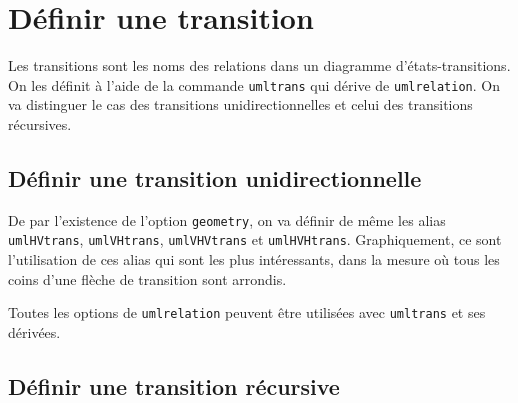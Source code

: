 \documentclass[a4paper,11pt]{report}
\newcommand{\inputTikZ}[1]{%
  }%
\newcommand{\inputTikZ}[1]{%
    \texttt{[image: fig/\#1.pdf]}%
  }%
\begin{document}
\medskip

\begin{minipage}{0.51\textwidth}

\end{minipage}
\begin{minipage}{0.49\textwidth}
\begin{center}
\inputTikZ{statename}
\end{center}
\end{minipage}

\medskip

\section{Définir une transition}\label{s.trans}

Les transitions sont les noms des relations dans un diagramme d'états-transitions. On les définit à l'aide de la commande {\tt umltrans} qui dérive de {\tt umlrelation}. On va distinguer le cas des transitions unidirectionnelles et celui des transitions récursives.

\subsection{Définir une transition unidirectionnelle}\label{s.unitrans}

De par l'existence de l'option {\tt geometry}, on va définir de même les alias {\tt umlHVtrans}, {\tt umlVHtrans}, {\tt umlVHVtrans} et {\tt umlHVHtrans}. Graphiquement, ce sont l'utilisation de ces alias qui sont les plus intéressants, dans la mesure où tous les coins d'une flèche de transition sont arrondis.

\medskip

\begin{minipage}{0.51\textwidth}

\end{minipage}
\begin{minipage}{0.49\textwidth}
\begin{center}
\inputTikZ{transition}
\end{center}
\end{minipage}

\medskip

Toutes les options de {\tt umlrelation} peuvent être utilisées avec {\tt umltrans} et ses dérivées.

\subsection{Définir une transition récursive}\label{s.rectrans}
\end{document}
